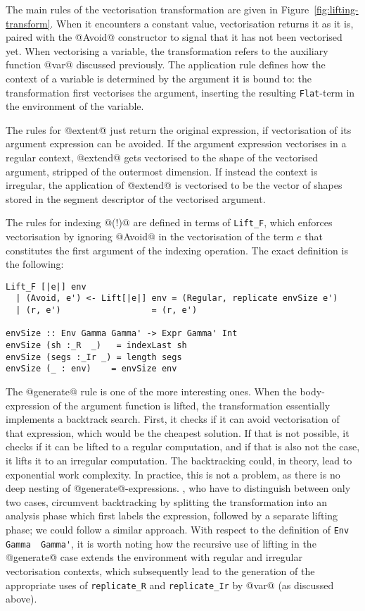 The main rules of the vectorisation transformation are given in Figure~\ref{fig:lifting-transform}. When it encounters a constant value, vectorisation returns it as it is, paired with the @Avoid@ constructor to signal that it has not been vectorised yet. When vectorising a variable, the transformation refers to the auxiliary function @var@ discussed previously. The application rule defines how the context of a variable is determined by the argument it is bound to: the transformation first vectorises the argument, inserting the resulting \lstinline[style=ndp]{Flat}-term in the environment of the variable.

The rules for @extent@ just return the original expression, if vectorisation of its argument expression can be avoided. If the argument expression vectorises in a regular context, @extend@  gets vectorised to the shape of the vectorised argument, stripped of the outermost dimension. If instead the context is irregular, the application of @extend@ is vectorised to be the vector of shapes stored in the segment descriptor of the vectorised argument.

The rules for indexing @(!)@ are defined in terms of \lstinline[style=ndp]{Lift_F}, which enforces vectorisation by ignoring @Avoid@ in the vectorisation of the term $e$ that constitutes the first argument of the indexing operation. The exact definition is the following:
%
\begin{lstlisting}[style=ndp]
Lift_F [|e|] env
  | (Avoid, e') <- Lift[|e|] env = (Regular, replicate envSize e')
  | (r, e')                  = (r, e')

envSize :: Env Gamma Gamma' -> Expr Gamma' Int
envSize (sh :_R  _)   = indexLast sh
envSize (segs :_Ir _) = length segs
envSize (_ : env)    = envSize env
\end{lstlisting}

The @generate@ rule is one of the more interesting ones. When the body-expression of the argument function is lifted, the transformation essentially implements a backtrack search. First, it checks if it can avoid vectorisation of that expression, which would be the cheapest solution. If that is not possible, it checks if it can be lifted to a regular computation, and if that is also not the case, it lifts it to an irregular computation. The backtracking could, in theory, lead to exponential work complexity. In practice, this is not a problem, as there is no deep nesting of @generate@-expressions. \citet{Keller:avoidance}, who have to distinguish between only two cases, circumvent backtracking by splitting the transformation into an analysis phase which first labels the expression, followed by a separate lifting phase; we could follow a similar approach. With respect to the definition of \lstinline[style=ndp]{Env Gamma  Gamma'}, it is worth noting how the recursive use of lifting in the @generate@ case extends the environment with regular and irregular vectorisation contexts, which subsequently lead to the generation of the appropriate uses of \lstinline[style=ndp]{replicate_R} and \lstinline[style=ndp]{replicate_Ir} by @var@ (as discussed above).

